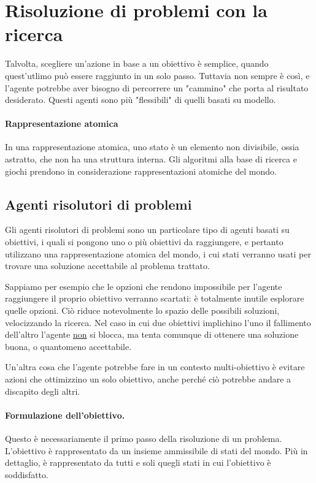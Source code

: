 \section{Risoluzione di problemi con la ricerca}
    Talvolta, scegliere un'azione in base a un obiettivo è semplice, quando quest'utlimo può essere raggiunto in un solo passo. Tuttavia non sempre è così, e l'agente potrebbe aver bisogno di percorrere un "cammino" che porta al risultato desiderato. Questi agenti sono più "flessibili" di quelli basati su modello.
    
    \paragraph{Rappresentazione atomica}
        In una rappresentazione atomica, uno stato è un elemento non divisibile, ossia astratto, che non ha una struttura interna. Gli algoritmi alla base di ricerca e giochi prendono in considerazione rappresentazioni atomiche del mondo.
        
    \subsection{Agenti risolutori di problemi}
        Gli agenti risolutori di problemi sono un particolare tipo di agenti basati su obiettivi, i quali si pongono uno o più obiettivi da raggiungere, e pertanto utilizzano una rappresentazione atomica del mondo, i cui stati verranno usati per trovare una soluzione accettabile al problema trattato.
        
        Sappiamo per esempio che le opzioni che rendono impossibile per l'agente raggiungere il proprio obiettivo verranno scartati: è totalmente inutile esplorare quelle opzioni. Ciò riduce notevolmente lo spazio delle possibili soluzioni, velocizzando la ricerca. Nel caso in cui due obiettivi implichino l'uno il fallimento dell'altro l'agente \underline{non} si blocca, ma tenta comunque di ottenere una soluzione buona, o quantomeno accettabile.
        
        Un'altra cosa che l'agente potrebbe fare in un contesto multi-obiettivo è evitare azioni che ottimizzino un solo obiettivo, anche perché ciò potrebbe andare a discapito degli altri.
        
        \paragraph{Formulazione dell'obiettivo.} Questo è necessariamente il primo passo della risoluzione di un problema. L'obiettivo è rappresentato da un insieme ammissibile di stati del mondo. Più in dettaglio, è rappresentato da tutti e soli quegli stati in cui l'obiettivo è soddisfatto.
        

